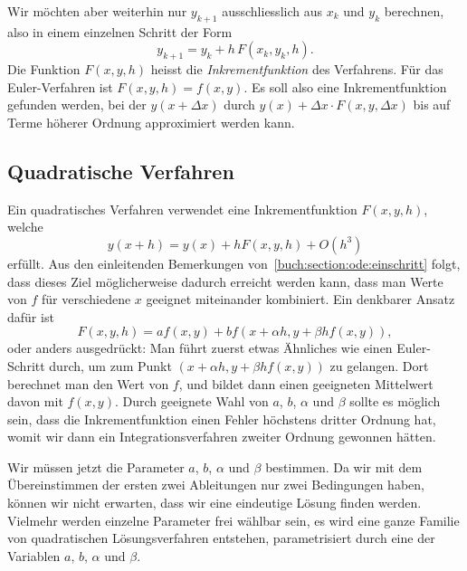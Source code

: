 Wir möchten aber weiterhin nur $y_{k+1}$ ausschliesslich aus $x_k$ und $y_k$
berechnen, also in einem einzelnen Schritt der Form
\[
y_{k+1}=y_k + h\, F(x_k, y_k, h).
\]
Die Funktion $F(x,y,h)$ heisst die {\em Inkrementfunktion}
%
des Verfahrens.
Für das Euler-Verfahren ist $F(x,y,h)=f(x,y)$.
Es soll also eine Inkrementfunktion gefunden werden, bei der $y(x+\Delta x)$
durch $y(x) + \Delta x\cdot F(x,y,\Delta x)$ bis auf Terme höherer
Ordnung approximiert werden kann.

\subsection{Quadratische Verfahren\label{buch:subsection:quadratischeverfahren}}
%
Ein quadratisches Verfahren verwendet eine Inkrementfunktion $F(x,y,h)$,
welche
\[
y(x+h)=y(x)+hF(x,y,h)+O(h^3)
\]
erfüllt.
Aus den einleitenden Bemerkungen von~\ref{buch:section:ode:einschritt}
folgt, dass dieses Ziel möglicherweise dadurch erreicht werden kann,
dass man Werte von $f$ für verschiedene $x$ geeignet miteinander
kombiniert.
Ein denkbarer Ansatz dafür ist
\[
F(x,y,h)=af(x,y) + bf(x+\alpha h, y +\beta hf(x,y)),
\]
oder anders ausgedrückt: Man führt zuerst etwas Ähnliches wie einen
Euler-Schritt durch, um zum Punkt $(x+\alpha h,y+\beta hf(x,y))$ zu
gelangen.
%
Dort berechnet man den Wert von $f$, und bildet dann einen geeigneten
Mittelwert davon  mit $f(x,y)$.
Durch geeignete Wahl von $a$, $b$, $\alpha$ und $\beta$ sollte es möglich
sein, dass die Inkrementfunktion einen Fehler höchstens dritter Ordnung
hat, womit wir dann ein Integrationsverfahren zweiter Ordnung gewonnen
hätten.

Wir müssen jetzt die Parameter $a$, $b$, $\alpha$ und $\beta$ bestimmen.
Da wir mit dem Übereinstimmen der ersten zwei Ableitungen
nur zwei Bedingungen haben, können wir nicht erwarten, dass wir
eine eindeutige Lösung finden werden.
Vielmehr werden einzelne Parameter frei wählbar sein, es wird eine
ganze Familie von quadratischen Lösungsverfahren entstehen, parametrisiert
durch eine der Variablen $a$, $b$, $\alpha$ und $\beta$.

